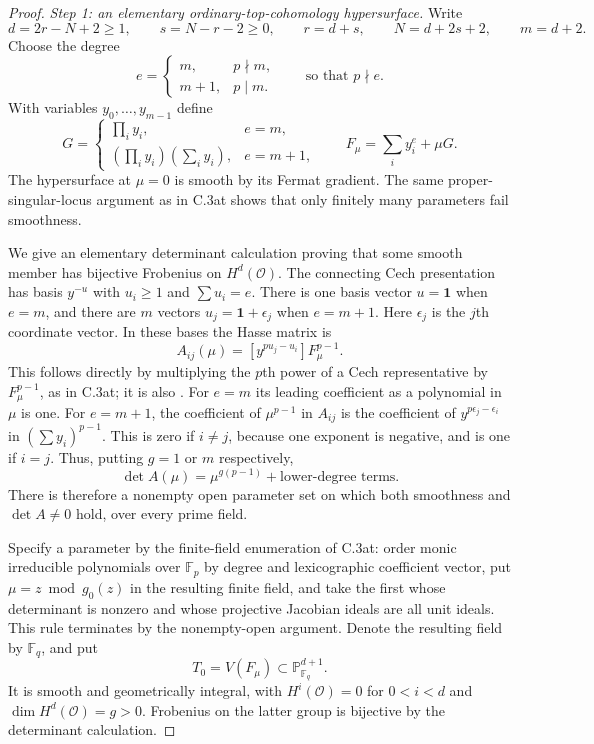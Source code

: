 \begin{proof}
\emph{Step 1: an elementary ordinary-top-cohomology hypersurface.}
Write
\[
 d=2r-N+2\ge1,\qquad s=N-r-2\ge0,
 \qquad r=d+s,\qquad N=d+2s+2,
 \qquad m=d+2.
\]
Choose the degree
\[
 e=\begin{cases}m,&p\nmid m,\\m+1,&p\mid m.\end{cases}
 \qquad\text{so that }p\nmid e.
\]
With variables $y_0,\ldots,y_{m-1}$ define
\[
 G=\begin{cases}
       \prod_i y_i,&e=m,\\
       (\prod_i y_i)(\sum_i y_i),&e=m+1,
    \end{cases}
 \qquad
 F_\mu=\sum_i y_i^e+\mu G.
\]
The hypersurface at $\mu=0$ is smooth by its Fermat gradient.
The same proper-singular-locus argument as in C.3at shows that
only finitely many parameters fail smoothness.

We give an elementary determinant calculation proving that some smooth
member has bijective Frobenius on $H^d(\mathcal O)$. The connecting
Cech presentation has basis $y^{-u}$ with $u_i\ge1$ and $\sum u_i=e$.
There is one basis vector $u=\mathbf1$ when $e=m$, and there are
$m$ vectors $u_j=\mathbf1+\epsilon_j$ when $e=m+1$.
Here $\epsilon_j$ is the $j$th coordinate vector. In these bases the
Hasse matrix is
\[
 A_{ij}(\mu)=[y^{p u_j-u_i}]F_\mu^{p-1}.
\]
This follows directly by multiplying the $p$th power of a Cech
representative by $F_\mu^{p-1}$, as in C.3at; it is also
\citet[Corollary~2.3, author p.~8]{D_HuangLianYauYuHasse}.
For $e=m$ its leading coefficient as a polynomial in $\mu$ is one.
For $e=m+1$, the coefficient of $\mu^{p-1}$ in $A_{ij}$ is the
coefficient of $y^{p\epsilon_j-\epsilon_i}$ in
$(\sum y_i)^{p-1}$. This is zero if $i\ne j$, because one exponent
is negative, and is one if $i=j$. Thus, putting
$g=1$ or $m$ respectively,
\[
                 \det A(\mu)=\mu^{g(p-1)}+
                                    \text{lower-degree terms}.
\]
There is therefore a nonempty open parameter set on which both
smoothness and $\det A\ne0$ hold, over every prime field.

Specify a parameter by the finite-field enumeration of C.3at: order
monic irreducible polynomials over $\mathbb F_p$ by degree and
lexicographic coefficient vector, put $\mu=z\bmod g_0(z)$ in the
resulting finite field, and take the first whose determinant is
nonzero and whose projective Jacobian ideals are all unit ideals.
This rule terminates by the nonempty-open argument. Denote the
resulting field by $\mathbb F_q$, and put
\[
 T_0=V(F_\mu)\subset\mathbb P^{d+1}_{\mathbb F_q}.
\]
It is smooth and geometrically integral, with
$H^i(\mathcal O)=0$ for $0<i<d$ and
$\dim H^d(\mathcal O)=g>0$. Frobenius on the latter group is
bijective by the determinant calculation.


\end{proof}
